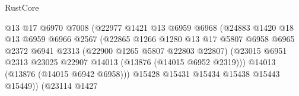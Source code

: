 \begin{lexlean}{RustCore}
\begin{coremodule}
                                              @13
                                              @17
                                              @6970
                                              @7008
                                              (@22977
                                                @1421
                                                @13
                                                @6959
                                                @6968
                                                (@24883
                                                  @1420
                                                  @18
                                                  @13
                                                  @6959
                                                  @6966
                                                  @2567
                                                  (@22865
                                                    @1266
                                                    @1280
                                                    @13
                                                    @17
                                                    @5807
                                                    @6958
                                                    @6965
                                                    @2372
                                                    @6941
                                                    @2313
                                                    (@22900 @1265 @5807 @22803 @22807)
                                                    (@23015
                                                      @6951
                                                      @2313
                                                      @23025
                                                      @22907
                                                      @14013
                                                      (@13876 (@14015 @6952 @2319)))
                                                    @14013
                                                    (@13876 (@14015 @6942 @6958)))
                                                  @15428
                                                  @15431
                                                  @15434
                                                  @15438
                                                  @15443
                                                  @15449))
                                              (@23114
                                                @1427

\end{coremodule}
\end{lexlean}
